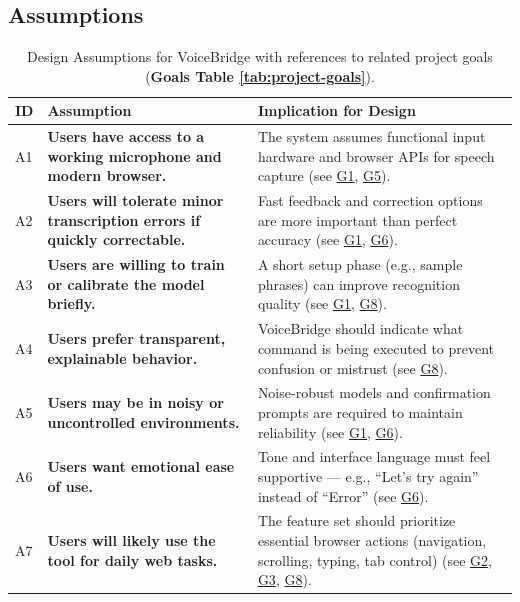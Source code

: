\documentclass[12pt]{article}
\begin{document}
\subsection{Assumptions}
\begin{table}[H]
\centering
\begin{tabularx}{\textwidth}{p{1cm}p{6cm}X}
\toprule {\textbf{ID}} & {\textbf{Assumption}} & {\textbf{Implication for Design}}\\
\midrule
A1 & \textbf{Users have access to a working microphone and modern browser.} & The system assumes functional input hardware and browser APIs for speech capture (see \hyperref[tab:project-goals]{G1}, \hyperref[tab:project-goals]{G5}). \\ \hline
A2 & \textbf{Users will tolerate minor transcription errors if quickly correctable.} & Fast feedback and correction options are more important than perfect accuracy (see \hyperref[tab:project-goals]{G1}, \hyperref[tab:project-goals]{G6}). \\ \hline
A3 & \textbf{Users are willing to train or calibrate the model briefly.} & A short setup phase (e.g., sample phrases) can improve recognition quality (see \hyperref[tab:project-goals]{G1}, \hyperref[tab:project-goals]{G8}). \\ \hline
A4 & \textbf{Users prefer transparent, explainable behavior.} & VoiceBridge should indicate what command is being executed to prevent confusion or mistrust (see \hyperref[tab:project-goals]{G8}). \\ \hline
A5 & \textbf{Users may be in noisy or uncontrolled environments.} & Noise-robust models and confirmation prompts are required to maintain reliability (see \hyperref[tab:project-goals]{G1}, \hyperref[tab:project-goals]{G6}). \\ \hline
A6 & \textbf{Users want emotional ease of use.} & Tone and interface language must feel supportive — e.g., “Let’s try again” instead of “Error” (see \hyperref[tab:project-goals]{G6}). \\ \hline
A7 & \textbf{Users will likely use the tool for daily web tasks.} & The feature set should prioritize essential browser actions (navigation, scrolling, typing, tab control) (see \hyperref[tab:project-goals]{G2}, \hyperref[tab:project-goals]{G3}, \hyperref[tab:project-goals]{G8}). \\
\bottomrule
\end{tabularx}
\caption{Design Assumptions for VoiceBridge with references to related project goals (\textbf{Goals Table \ref{tab:project-goals}}).}
\label{tab:assumptions}
\end{table}
\end{document}
